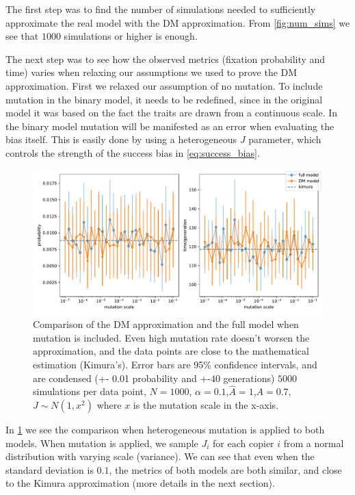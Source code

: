 \documentclass[11pt]{article}
\begin{document}
The first step was to find the number of simulations needed to sufficiently approximate the real model with the DM approximation. From \cref{fig:num_sims} we see that $1000$ simulations or higher is enough.

The next step was to see how the observed metrics (fixation probability and time) varies when relaxing our assumptions we used to prove the DM approximation.
First we relaxed our assumption of no mutation. To include mutation in the binary model, it needs to be redefined, since in the original model it was based on the fact the traits are drawn from a continuous scale. In the binary model mutation will be manifested as an error when evaluating the bias itself. This is easily done by using a heterogeneous $J$ parameter, which controls the strength of the success bias in \cref{eq:success_bias}.


\begin{figure}
    \includegraphics[width=\linewidth]{../figures/binary/full_vs_dm_mutation.pdf}
  \caption{Comparison of the DM approximation and the full model when mutation is included. Even high mutation rate doesn't worsen the approximation, and the data points are close to the mathematical estimation (Kimura's). Error bars are 95\% confidence intervals, and are condensed (+- 0.01 probability and +-40 generations)
  $5000$ simulations per data point, $N=1000$, $\alpha=0.1$,$\hat{A}=1$,$A=0.7$, $J\sim N(1,x^2)$ where $x$ is the mutation scale in the x-axis.
  }	
  \label{fig:hetro_mutation}
\end{figure}


In \cref{fig:hetro_mutation} we see the comparison when heterogeneous mutation is applied to both models. When mutation is applied, we sample $J_i$ for each copier $i$ from a normal distribution with varying scale (variance).
We can see that even when the standard deviation is $0.1$, the metrics of both models are both similar, and close to the Kimura approximation (more details in the next section). 
\end{document}
